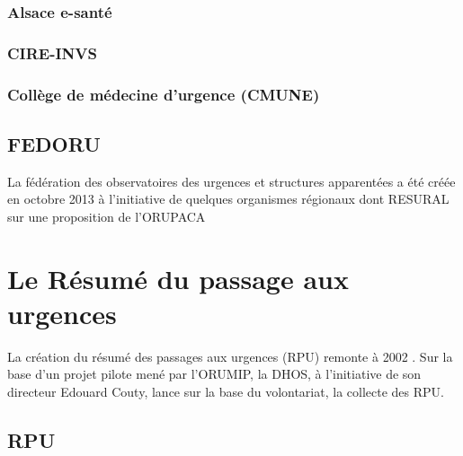 \documentclass[12pt,english,french,twoside]{book}\usepackage[]{graphicx}\usepackage[]{color}
\begin{document}
  \subsection*{Alsace e-santé}
    
  \subsection*{CIRE-INVS}
    
  \subsection*{Collège de médecine d'urgence (CMUNE)}

\section*{FEDORU}
  
La fédération des observatoires des urgences et structures apparentées a été créée en octobre 2013 à l'initiative de quelques organismes régionaux dont RESURAL sur une proposition de l'ORUPACA 

\newpage
\chapter{Le Résumé du passage aux urgences}



La création du résumé des passages aux urgences (RPU) remonte à 2002 \cite{11}. Sur la base d'un projet pilote mené par l'ORUMIP, la DHOS, à l'initiative de son directeur Edouard Couty, lance sur la base du volontariat, la collecte des RPU.

\section*{RPU}
\end{document}
